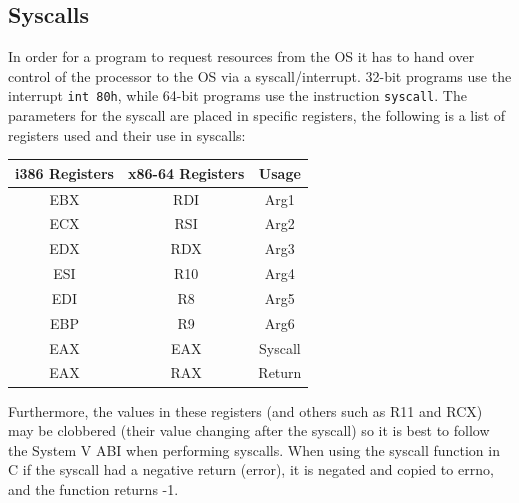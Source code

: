 \documentclass{article}
\newcommand{\layout}[1]{\parbox{\linewidth}{#1}}
\begin{document}
\layout{
  \subsection{Syscalls}

  In order for a program to request resources from the OS it has to hand over control of the processor to the OS via a syscall/interrupt.
  32-bit programs use the interrupt \texttt{int 80h}, while 64-bit programs use the instruction \texttt{syscall}.
  The parameters for the syscall are placed in specific registers, the following is a list of registers used and their use in syscalls:

  \begin{table}[H]
    \centering
    \begin{tabular}{|c|c|c|}
      \hline \textbf{i386 Registers} & \textbf{x86-64 Registers} & \textbf{Usage} \\ \hline
      EBX & RDI & Arg1 \\
      ECX & RSI & Arg2 \\
      EDX & RDX & Arg3 \\
      ESI & R10 & Arg4 \\
      EDI & R8 & Arg5 \\
      EBP & R9 & Arg6 \\
      EAX & EAX & Syscall \\
      EAX & RAX & Return \\
      \hline
    \end{tabular}
  \end{table}
}

\layout{
  Furthermore, the values in these registers (and others such as R11 and RCX) may be clobbered (their value changing after the syscall) so it is best to follow the System V ABI when performing syscalls.
  When using the syscall function in C if the syscall had a negative return (error), it is negated and copied to errno, and the function returns -1.

  \bigskip \cite{man-syscall}
} \bigskip

\newcommand{\sysd}[1]{\hline \multicolumn{10}{|p{0.97\linewidth}|}{#1} \\}
\newcommand{\sysxxxxxx}[6]{\sysxxxxx{#1}{#2}{#3}{#4}{#5} \\ 6: #6}
\newcommand{\sysxxxxx}[5]{\sysxxxx{#1}{#2}{#3}{#4} \\ 5: #5}
\newcommand{\sysxxxx}[4]{\sysxxx{#1}{#2}{#3} \\ 4: #4}
\newcommand{\sysxxx}[3]{\sysxx{#1}{#2} \\ 3: #3}
\newcommand{\sysxx}[2]{\sysx{#1} \\ 2: #2}
\newcommand{\sysx}[1]{1: #1}
\newcommand{\sys}{}
\end{document}
